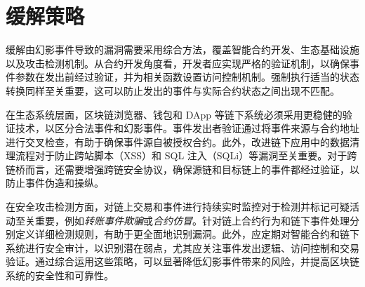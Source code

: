 \section{缓解策略}
\label{sec:mitigation}

缓解由幻影事件导致的漏洞需要采用综合方法，覆盖智能合约开发、生态基础设施以及攻击检测机制。从合约开发角度看，开发者应实现严格的验证机制，以确保事件参数在发出前经过验证，并为相关函数设置访问控制机制。强制执行适当的状态转换同样至关重要，这可以防止发出的事件与实际合约状态之间出现不匹配。

在生态系统层面，区块链浏览器、钱包和 DApp 等链下系统必须采用更稳健的验证技术，以区分合法事件和幻影事件。事件发出者验证通过将事件来源与合约地址进行交叉检查，有助于确保事件源自被授权合约。此外，改进链下应用中的数据清理流程对于防止跨站脚本（XSS）和 SQL 注入（SQLi）等漏洞至关重要。对于跨链桥而言，还需要增强跨链安全协议，确保源链和目标链上的事件都经过验证，以防止事件伪造和操纵。

在安全攻击检测方面，对链上交易和事件进行持续实时监控对于检测并标记可疑活动至关重要，例如\emph{转账事件欺骗}或\emph{合约仿冒}。针对链上合约行为和链下事件处理分别定义详细检测规则，有助于更全面地识别漏洞。此外，应定期对智能合约和链下系统进行安全审计，以识别潜在弱点，尤其应关注事件发出逻辑、访问控制和交易验证。通过综合运用这些策略，可以显著降低幻影事件带来的风险，并提高区块链系统的安全性和可靠性。
